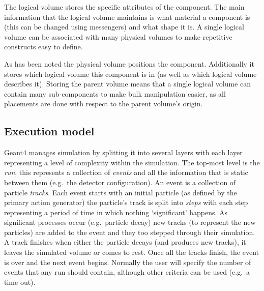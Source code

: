 The logical volume stores the specific attributes of the component. The main information that the logical volume maintains is what material a component is (this can be changed using messengers) and what shape it is. A single logical volume can be associated with many physical volumes to make repetitive constructs easy to define.

As has been noted the physical volume positions the component. Additionally it stores which logical volume this component is in (as well as which logical volume describes it). Storing the parent volume means that a single logical volume can contain many sub-components to make bulk manipulation easier, as all placements are done with respect to the parent volume's origin.

\subsection{Execution model} %
\label{sub:execution_model}

Geant4 manages simulation by splitting it into several layers with each layer representing a level of complexity within the simulation. The top-most level is the \emph{run}, this represents a collection of \emph{events} and all the information that is static between them (e.g.\ the detector configuration). An event is a collection of particle \emph{tracks}. Each event starts with an initial particle (as defined by the primary action generator) the particle's track is split into \emph{steps} with each step representing a period of time in which nothing `significant' happens. As significant processes occur (e.g.\ particle decay) new tracks (to represent the new particles) are added to the event and they too stepped through their simulation. A track finishes when either the particle decays (and produces new tracks), it leaves the simulated volume or comes to rest. Once all the tracks finish, the event is over and the next event begins. Normally the user will specify the number of events that any run should contain, although other criteria can be used (e.g.\ a time out).

